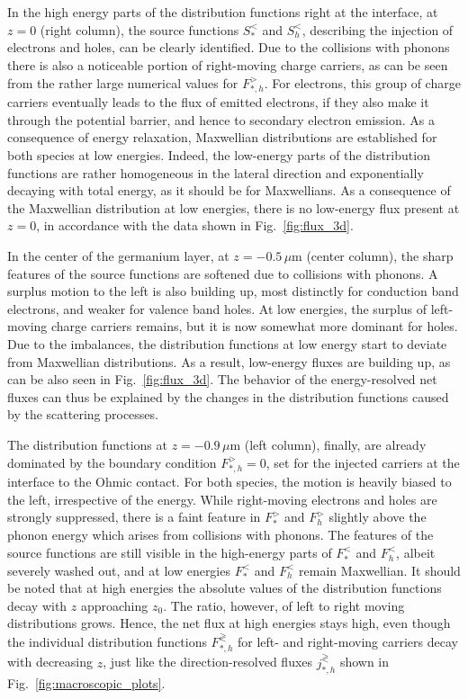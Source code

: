 \documentclass[pre,reprint,floats]{revtex4-1}
\begin{document}
In the high energy parts of the distribution functions right at the interface, at $z=0$ (right column), 
the source functions $S_*^<$ and $S_h^<$, describing the injection of electrons and holes, can be clearly 
identified. Due to the collisions with phonons there is also a noticeable portion of right-moving 
charge carriers, as can be seen from the rather large numerical values for $F_{*,h}^>$. For electrons, 
this group of charge carriers eventually leads to the flux of emitted electrons, if they also make it 
through the potential barrier, and hence to secondary electron emission. As a consequence of energy 
relaxation, Maxwellian distributions are established for both species at low energies. Indeed, 
the low-energy parts of the distribution functions are rather homogeneous in the lateral direction 
and exponentially decaying with total energy, as it should be for Maxwellians. As a consequence 
of the Maxwellian distribution at low energies, there is no low-energy flux present at $z=0$, 
in accordance with the data shown in Fig.~\ref{fig:flux_3d}.

In the center of the germanium layer, at $z=-0.5\,\mu$m (center column), the sharp features of the 
source functions are softened due to collisions with phonons. A surplus motion to the left is also
building up, most distinctly for conduction band electrons, and weaker for valence band holes. At
low energies, the surplus of left-moving charge carriers remains, but it is now somewhat more dominant 
for holes. Due to the imbalances, the distribution functions at low energy start to deviate from
Maxwellian distributions. As a result, low-energy fluxes are building up, as can be also seen in
Fig.~\ref{fig:flux_3d}. The behavior of the energy-resolved net fluxes can thus be explained by 
the changes in the distribution functions caused by the scattering processes.

The distribution functions at \mbox{$z=-0.9\,\mu$m} (left column), finally, are already dominated by the boundary
condition $F_{*,h}^>=0$, set for the injected carriers at the interface to the Ohmic contact. For both species,
the motion is heavily biased to the left, irrespective of the energy. While right-moving electrons and holes 
are strongly suppressed, there is a faint feature in $F_{*}^>$ and  $F_{h}^>$ slightly above the phonon 
energy which arises from collisions with phonons. The features of the source functions are still visible
in the high-energy parts of $F_*^<$ and  $F_h^<$, albeit severely washed out, and at low energies 
$F_*^<$ and  $F_h^<$ remain Maxwellian. It should be noted that at high energies the absolute values of 
the distribution functions decay with $z$ approaching $z_0$. The ratio, however, of left to right moving 
distributions grows. Hence, the net flux at high energies stays high, even though the individual distribution
functions $F_{*,h}^\gtrless$ for left- and right-moving carriers decay with decreasing $z$, just like the 
direction-resolved fluxes $j_{*,h}^\gtrless$ shown in Fig.~\ref{fig:macroscopic_plots}.
\end{document}
